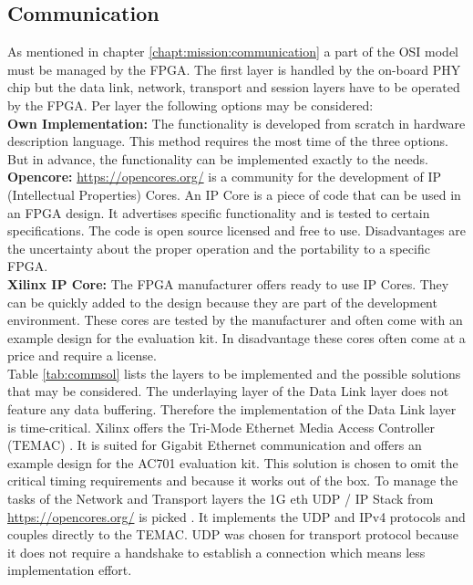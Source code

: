 \subsection{Communication} \label{chapt:mission:possible:communication}
As mentioned in chapter \ref{chapt:mission:communication} a part of the OSI
model must be managed by the FPGA. The first layer is handled by the
on-board PHY chip but the data link, network, transport and session layers have
to be operated by the FPGA. Per layer the following options may be considered:
\\

\textbf{Own Implementation:}
The functionality is developed from scratch in hardware description language.
This method requires the most time of the three options. But in advance, the
functionality can be implemented exactly to the needs.
\\

\textbf{Opencore:} \url{https://opencores.org/} is a community for the
development of IP (Intellectual Properties) Cores. An IP Core is a piece of code
that can be used in an FPGA design. It advertises specific functionality and is
tested to certain specifications. The code is open source licensed and free to
use. Disadvantages are the uncertainty about the proper operation and the
portability to a specific FPGA.
\\

\textbf{Xilinx IP Core:} The FPGA manufacturer offers ready to use IP Cores.
They can be quickly added to the design because they are part of the development
environment. These cores are tested by the manufacturer and often come with an
example design for the evaluation kit. In disadvantage these cores often come at
a price and require a license.
\\

Table \ref{tab:commsol} lists the layers to be implemented and the possible
solutions that may be considered. The underlaying layer of the Data Link layer
does not feature any data buffering. Therefore the implementation of the Data
Link layer is time-critical. Xilinx offers the Tri-Mode Ethernet Media Access
Controller (TEMAC) \cite{temac}. It is suited for Gigabit Ethernet communication
and offers an example design for the AC701 evaluation kit. This solution is
chosen to omit the critical timing requirements and because it works out of the
box. 
To manage the tasks of the Network and Transport layers the 1G eth UDP / IP Stack
from \url{https://opencores.org/} is picked \cite{udpipstack}. It implements the
UDP and IPv4 protocols and couples directly to the TEMAC. UDP was chosen for
transport protocol because it does not require a handshake to establish a
connection which means less implementation effort. 

